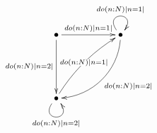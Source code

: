 $\xymatrix{
   \bullet \ar[rr]^{do(n:N) | n = 1 | } \ar[dd]_{do(n:N) | n = 2 | } && \bullet \ar@(ul,ur)^{do(n:N) | n = 1 | } \ar@(d,r)[ddll]^{do(n:N) | n = 2 | } \\ \\
   \bullet \ar@/^/[uurr]|-{do(n:N) | n = 1 | } \ar@(dl,dr)[]_{do(n:N) | n = 2 | }}$